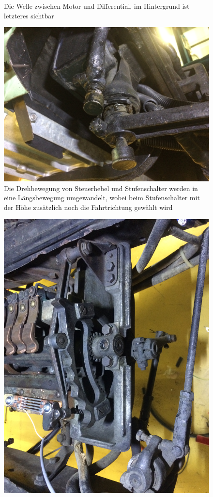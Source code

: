 \begin{landscape}
\begin{figure}[h]
	\caption{Die Welle zwischen Motor und Differential, im Hintergrund ist letzteres sichtbar}
	\label{fig:Differential}
\end{figure}
\begin{figure}[h]
	\centering
		\includegraphics[width=1.30\textwidth]{images/Anhang/Lenkung_Stufenschalter.jpg}
	\caption{Die Drehbewegung von Steuerhebel und Stufenschalter werden in eine Längsbewegung umgewandelt, wobei beim Stufenschalter mit der Höhe zusätzlich noch die Fahrtrichtung gewählt wird}
	\label{fig:Lenkung_Stufenschalter}
\end{figure}
\begin{figure}[h]
	\centering
		\includegraphics[angle=180,width=1.30\textwidth]{images/Anhang/Stufenschalter_2.jpg}

\end{figure}
\end{landscape}
